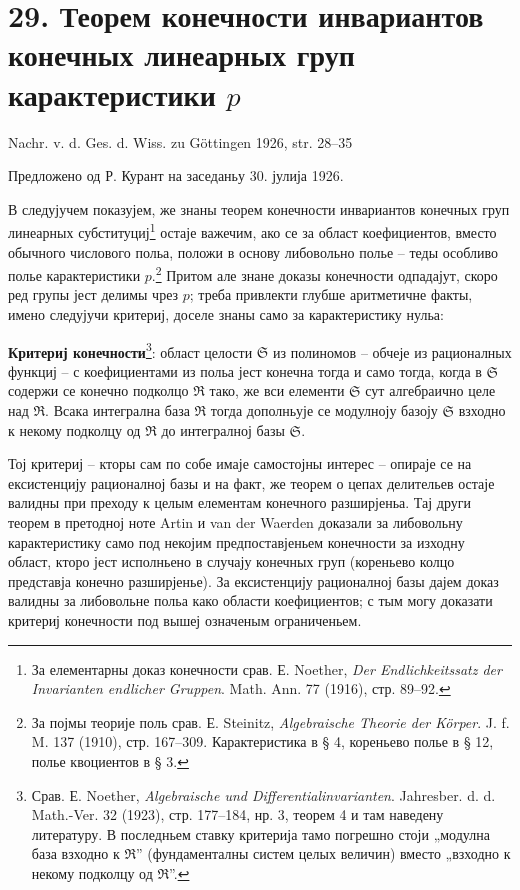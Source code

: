 ﻿\documentclass[11pt]{article}
\begin{document}
\section*{29. Теорем конечности инвариантов конечных линеарных груп карактеристики $p$}

\begin{center}
Nachr. v. d. Ges. d. Wiss. zu Göttingen 1926, str. 28--35
\end{center}

Предложено од Р. Курант на заседаньу 30. јулија 1926.

В следујучем показујем, же знаны теорем конечности инвариантов конечных груп линеарных субституциј\footnote{За елементарны доказ конечности срав. Е. Noether, \emph{Der Endlichkeitssatz der Invarianten endlicher Gruppen}. Math. Ann. 77 (1916), стр. 89--92.} остаје важечим, ако се за област коефициентов, вместо обычного числового польа, положи в основу либовольно полье -- теды особливо полье карактеристики $p$.\footnote{За појмы теорије поль срав. Е. Steinitz, \emph{Algebraische Theorie der Körper}. J. f. M. 137 (1910), стр. 167--309. Карактеристика в § 4, кореньево полье в § 12, полье квоциентов в § 3.} Притом але знане доказы конечности одпадајут, скоро ред групы јест делимы чрез $p$; треба привлекти глубше аритметичне факты, имено следујучи критериј, доселе знаны само за карактеристику нульа:

\textbf{Критериј конечности}\footnote{Срав. Е. Noether, \emph{Algebraische und Differentialinvarianten}. Jahresber. d. d. Math.-Ver. 32 (1923), стр. 177--184, нр. 3, теорем 4 и там наведену литературу. В последньем ставку критерија тамо погрешно стоји „модулна база взходно к $\mathfrak R$” (фундаменталны систем целых величин) вместо „взходно к некому подколцу од $\mathfrak R$”.}: област целости $\mathfrak S$ из полиномов -- обчеје из рационалных функциј -- с коефициентами из польа јест конечна тогда и само тогда, когда в $\mathfrak S$ содержи се конечно подколцо $\mathfrak R$ тако, же вси елементи $\mathfrak S$ сут алгебраично целе над $\mathfrak R$. Всака интегрална база $\mathfrak R$ тогда дополньује се модулноју базоју $\mathfrak S$ взходно к некому подколцу од $\mathfrak R$ до интегралној базы $\mathfrak S$.

Тој критериј -- кторы сам по собе имаје самостојны интерес -- опираје се на ексистенцију рационалној базы и на факт, же теорем о цепах делительев остаје валидны при преходу к целым елементам конечного разширјеньа. Тај други теорем в претодној ноте Artin и van der Waerden доказали за либовольну карактеристику само под некојим предпоставјеньем конечности за изходну област, кторо јест исполньено в случају конечных груп (кореньево колцо представја конечно разширјенье). За ексистенцију рационалној базы дајем доказ валидны за либовольне польа како области коефициентов; с тым могу доказати критериј конечности под вышеј означеным ограниченьем.
\end{document}
